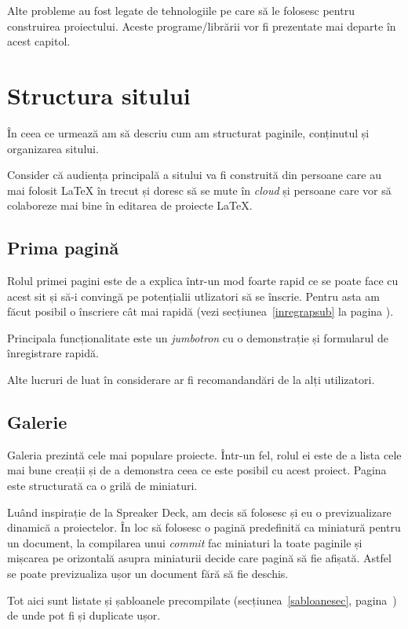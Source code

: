 \documentclass[a4wide,12pt]{report}
\newcommand{\eng}[1]{\emph{#1}} %
\begin{document}
Alte probleme au fost legate de tehnologiile pe care să le folosesc pentru
construirea proiectului. Aceste programe/librării vor fi prezentate mai departe
în acest capitol.

\section{Structura sitului}

În ceea ce urmează am să descriu cum am structurat paginile, conținutul și
organizarea sitului.

Consider că audiența principală a sitului va fi construită din persoane care au
mai folosit \LaTeX{} în trecut și doresc să se mute în \eng{cloud} și persoane
care vor să colaboreze mai bine în editarea de proiecte \LaTeX{}.

\subsection{Prima pagină}

Rolul primei pagini este de a explica într-un mod foarte rapid ce se poate face
cu acest sit și să-i convingă pe potențialii utlizatori să se înscrie. Pentru
asta am făcut posibil o înscriere cât mai rapidă (vezi
secțiunea~\ref{inregrapsub} la pagina \pageref{inregrapsub}).

Principala funcționalitate este un \eng{jumbotron} cu o demonstrație și
formularul de înregistrare rapidă.

Alte lucruri de luat în considerare ar fi recomandandări de la alți utilizatori.

\subsection{Galerie}
\label{galeriesub}

Galeria prezintă cele mai populare proiecte. Într-un fel, rolul ei este de a
lista cele mai bune creații și de a demonstra ceea ce este posibil cu acest
proiect. Pagina este structurată ca o grilă de miniaturi.

Luând inspirație de la Spreaker Deck, am decis să folosesc și eu o
previzualizare dinamică a proiectelor. În loc să folosesc o pagină predefinită
ca miniatură pentru un document, la compilarea unui \eng{commit} fac miniaturi
la toate paginile și mișcarea pe orizontală asupra miniaturii decide care pagină
să fie afișată. Astfel se poate previzualiza ușor un document fără să fie
deschis.

Tot aici sunt listate și șabloanele precompilate (secțiunea~\ref{sabloanesec},
pagina~\pageref{sabloanesec}) de unde pot fi și duplicate ușor.
\end{document}
